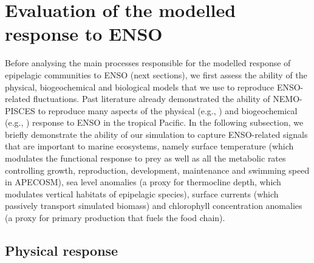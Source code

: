 \section{Evaluation of the modelled response to ENSO}
\label{sec:model-val}

Before analysing the main processes responsible for the modelled response of epipelagic communities to ENSO (next sections), we first assess the ability of the physical, biogeochemical and biological models that we use to reproduce ENSO-related fluctuations. Past literature already demonstrated the ability of NEMO-PISCES to reproduce many aspects of the physical (e.g., \citealt{vialardModelStudyOceanic2001, lengaigneMechanismsControllingWarm2012, drushkaProcessesDrivingIntraseasonal2015, puyModulationEquatorialPacific2019}) and biogeochemical (e.g., \citealt{ masottiLargescaleShiftsPhytoplankton2011,gorguesRevisitingNina19982010, martinezReconstructingGlobalChlorophylla2020}) response to ENSO in the tropical Pacific. In the following subsection, we briefly demonstrate the ability of our simulation to capture ENSO-related signals that are important to marine ecosystems, namely surface temperature (which modulates the functional response to prey as well as all the metabolic rates controlling growth, reproduction, development, maintenance and swimming speed in APECOSM), sea level anomalies (a proxy for thermocline depth, which modulates vertical habitats of epipelagic species), surface currents (which passively transport simulated biomass) and chlorophyll concentration anomalies (a proxy for primary production that fuels the food chain).

\subsection{Physical response}

